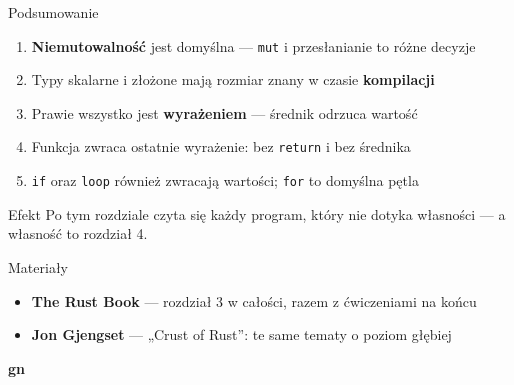 \begin{frame}{Podsumowanie}
  \begin{enumerate}
    \item \textbf{Niemutowalność} jest domyślna --- \texttt{mut} i przesłanianie to różne decyzje
    \item Typy skalarne i złożone mają rozmiar znany w czasie \textbf{kompilacji}
    \item Prawie wszystko jest \textbf{wyrażeniem} --- średnik odrzuca wartość
    \item Funkcja zwraca ostatnie wyrażenie: bez \texttt{return} i bez średnika
    \item \texttt{if} oraz \texttt{loop} również zwracają wartości; \texttt{for} to domyślna pętla
  \end{enumerate}
  \vspace{0.2cm}
  \begin{exampleblock}{Efekt}
    Po tym rozdziale czyta się każdy program, który nie dotyka własności ---
    a własność to rozdział 4.
  \end{exampleblock}
\end{frame}

\begin{frame}{Materiały}
  \begin{itemize}
    \item \textbf{The Rust Book} --- rozdział 3 w całości, razem z ćwiczeniami na końcu
    \item \textbf{Jon Gjengset} --- „Crust of Rust'': te same tematy o poziom głębiej
  \end{itemize}
  \vspace{0.35cm}
  \begin{center}
    \hspace{0.08\textwidth}%
  \end{center}
\end{frame}

\begin{frame}[plain]
  \begin{center}
    \vfill
    {\Huge\bfseries\color{stplwhite} gn}
    \vfill
  \end{center}
\end{frame}


